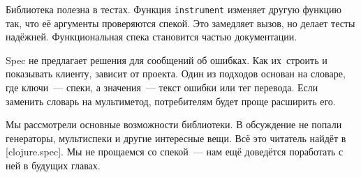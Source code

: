 Библиотека полезна в тестах. Функция \verb|instrument| изменяет другую функцию
так, что её аргументы проверяются спекой. Это замедляет вызов, но делает тесты
надёжней. Функциональная спека становится частью документации.

Spec не предлагает решения для сообщений об ошибках. Как их~строить и показывать
клиенту, зависит от проекта. Один из подходов основан на словаре, где ключи~---
спеки, а значения~--- текст ошибки или тег перевода. Если заменить словарь на
мультиметод, потребителям будет проще расширить его.

Мы рассмотрели основные возможности библиотеки. В обсуждение не попали
генераторы, мультиспеки и другие интересные вещи. Всё это читатель найдёт в
[clojure.spec].
Мы не прощаемся со спекой~--- нам ещё доведётся поработать с ней в будущих главах.
